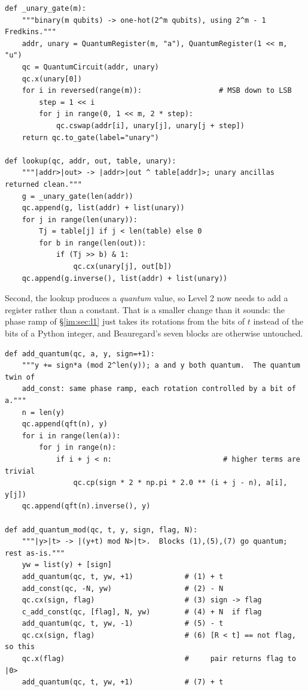 \documentclass[11pt]{article}
\theoremstyle{plain}
\theoremstyle{remark}
\begin{document}
\begin{lstlisting}
def _unary_gate(m):
    """binary(m qubits) -> one-hot(2^m qubits), using 2^m - 1 Fredkins."""
    addr, unary = QuantumRegister(m, "a"), QuantumRegister(1 << m, "u")
    qc = QuantumCircuit(addr, unary)
    qc.x(unary[0])
    for i in reversed(range(m)):                  # MSB down to LSB
        step = 1 << i
        for j in range(0, 1 << m, 2 * step):
            qc.cswap(addr[i], unary[j], unary[j + step])
    return qc.to_gate(label="unary")

def lookup(qc, addr, out, table, unary):
    """|addr>|out> -> |addr>|out ^ table[addr]>; unary ancillas returned clean."""
    g = _unary_gate(len(addr))
    qc.append(g, list(addr) + list(unary))
    for j in range(len(unary)):
        Tj = table[j] if j < len(table) else 0
        for b in range(len(out)):
            if (Tj >> b) & 1:
                qc.cx(unary[j], out[b])
    qc.append(g.inverse(), list(addr) + list(unary))
\end{lstlisting}

\noindent
Second, the lookup produces a \emph{quantum} value, so Level 2 now needs to add a register rather
than a constant. That is a smaller change than it sounds: the phase ramp of \S\ref{im:sec:l1} just
takes its rotations from the bits of $t$ instead of the bits of a Python integer, and Beauregard's
seven blocks are otherwise untouched.

\begin{lstlisting}
def add_quantum(qc, a, y, sign=+1):
    """y += sign*a (mod 2^len(y)); a and y both quantum.  The quantum twin of
    add_const: same phase ramp, each rotation controlled by a bit of a."""
    n = len(y)
    qc.append(qft(n), y)
    for i in range(len(a)):
        for j in range(n):
            if i + j < n:                          # higher terms are trivial
                qc.cp(sign * 2 * np.pi * 2.0 ** (i + j - n), a[i], y[j])
    qc.append(qft(n).inverse(), y)

def add_quantum_mod(qc, t, y, sign, flag, N):
    """|y>|t> -> |(y+t) mod N>|t>.  Blocks (1),(5),(7) go quantum; rest as-is."""
    yw = list(y) + [sign]
    add_quantum(qc, t, yw, +1)            # (1) + t
    add_const(qc, -N, yw)                 # (2) - N
    qc.cx(sign, flag)                     # (3) sign -> flag
    c_add_const(qc, [flag], N, yw)        # (4) + N  if flag
    add_quantum(qc, t, yw, -1)            # (5) - t
    qc.cx(sign, flag)                     # (6) [R < t] == not flag, so this
    qc.x(flag)                            #     pair returns flag to |0>
    add_quantum(qc, t, yw, +1)            # (7) + t
\end{lstlisting}
\end{document}
